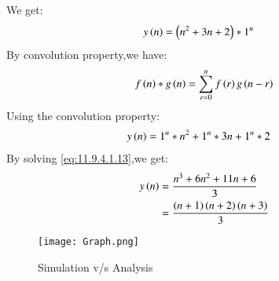 \documentclass[journal,12pt,twocolumn]{IEEEtran}
\theoremstyle{remark}
\begin{document}
We get:
\begin{align}
y\left(n\right)&=\left(n^2+3n+2\right)*1^n\label{eq:11.9.4.1.11}
\end{align}
By convolution property,we have:
\begin{align}
f\left(n\right)*g\left(n\right)=\sum_{r=0}^{n} f\left(r\right) g\left(n-r\right)\label{eq:11.9.4.1.12}
\end{align}
Using the convolution property:
\begin{align}
y\left(n\right)&=1^{n}*n^2+1^{n}*3n+1^{n}*2\label{eq:11.9.4.1.13}
\end{align}
By solving \eqref{eq:11.9.4.1.13},we get:
\begin{align}
y\left(n\right)&=\frac{n^3+6n^2+11n+6}{3}\label{eq:11.9.4.1.14}\\
&=\frac{\left(n+1\right)\left(n+2\right)\left(n+3\right)}{3}\label{eq:11.9.4.1.15}
\end{align}
\begin{figure}[h]
        \centering
\texttt{[image: Graph.png]}
    \caption{Simulation v/s Analysis}
    \label{fig:plot11.9.4.1}
\end{figure}
\end{document}

